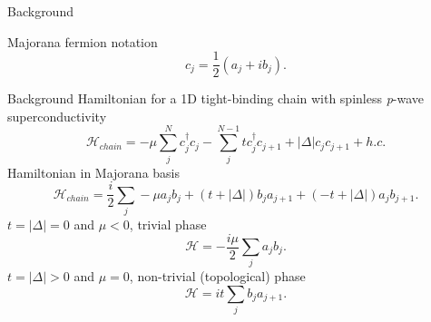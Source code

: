 \documentclass[xcolor=dvipsnames,10pt,aspectratio=169]{beamer}
\newcommand{\ham}{\mathcal{H}}
\newcommand{\cc}{c^{\dagger}}
\newcommand{\de}{\Delta}
\newcommand{\BD}{Background}
\begin{document}
  \begin{frame}{\BD}

    \vspace{20pt}
    Majorana fermion notation
    \begin{equation}
      c_j = \dfrac{1}{2}(a_j + i b_j).
    \end{equation}

  \end{frame}

  \begin{frame}{\BD}
    Hamiltonian for a 1D tight-binding chain with spinless \textit{p}-wave superconductivity
    \begin{equation}
      \ham_{chain} = -\mu\sum_j^N \cc_j c_j -\sum_j^{N-1} t \cc_j c_{j+1} + |\de| c_j c_{j+1} + h.c.
    \end{equation}
    Hamiltonian in Majorana basis
    \begin{equation}
      \ham_{chain} = \dfrac{i}{2} \sum_j -\mu a_j b_j + (t+|\de|) b_j a_{j+1} + (-t+|\de|) a_j b_{j+1}.
    \end{equation}
    $t=|\de|=0$ and $\mu<0$, trivial phase
    \begin{equation}
      \ham = -\dfrac{i\mu}{2} \sum_j a_j b_j.
    \end{equation}
    $t=|\de|>0$ and $\mu=0$, non-trivial (topological) phase
    \begin{equation}
      \ham = it \sum_j b_j a_{j+1}.
    \end{equation}

  \end{frame}
\end{document}
